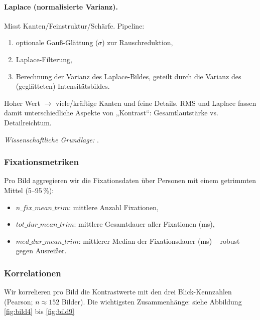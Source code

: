 \documentclass[
    language=german, %
    thesis=seminar, %
    supervisor=postdoc, %
    multiauthor=true, %
    ]{settings/csssa-thesis}
\begin{document}
\paragraph{Laplace (normalisierte Varianz).}
Misst Kanten/Feinstruktur/Schärfe. Pipeline: 
\begin{enumerate}[label=(\alph*)]
    \item optionale Gauß-Glättung ($\sigma$) zur Rauschreduktion, 
    \item Laplace-Filterung, 
    \item Berechnung der Varianz des Laplace-Bildes, geteilt durch die Varianz des (geglätteten) Intensitätsbildes. 
\end{enumerate}
Hoher Wert $\rightarrow$ viele/kräftige Kanten und feine Details. 
RMS und Laplace fassen damit unterschiedliche Aspekte von „Kontrast“: Gesamtlautstärke vs. Detailreichtum.  

\vspace{0.3em}
\noindent
\textit{Wissenschaftliche Grundlage:} \cite{Kukkonen1993}. 

\subsubsection{Fixationsmetriken}
Pro Bild aggregieren wir die Fixationsdaten über Personen mit einem getrimmten Mittel (5–95\,\%): 
\begin{itemize}
    \item $n\_fix\_mean\_trim$: mittlere Anzahl Fixationen, 
    \item $tot\_dur\_mean\_trim$: mittlere Gesamtdauer aller Fixationen (ms), 
    \item $med\_dur\_mean\_trim$: mittlerer Median der Fixationsdauer (ms) – robust gegen Ausreißer. 
\end{itemize}

\subsubsection{Korrelationen}
Wir korrelieren pro Bild die Kontrastwerte mit den drei Blick-Kennzahlen (Pearson; $n \approx 152$ Bilder). Die wichtigsten Zusammenhänge:
siehe Abbildung \ref{fig:bild4} bis \ref{fig:bild9}
\end{document}
